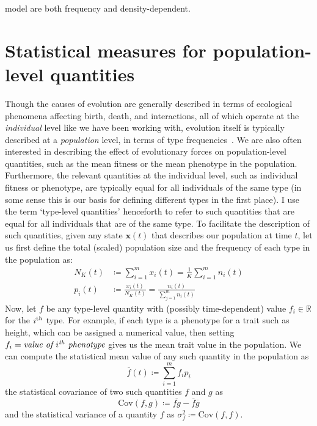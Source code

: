 model are both frequency and density-dependent.

\section{Statistical measures for population-level quantities}\label{sec_stat_measures}

Though the causes of evolution are generally described in terms of ecological phenomena affecting birth, death, and interactions, all of which operate at the \emph{individual} level like we have been working with, evolution itself is typically described at a \emph{population} level, in terms of type frequencies~\citep{bourrat_evolution_2019}. We are also often interested in describing the effect of evolutionary forces on population-level quantities, such as the mean fitness or the mean phenotype in the population. Furthermore, the relevant quantities at the individual level, such as individual fitness or phenotype, are typically equal for all individuals of the same type (in some sense this is our basis for defining different types in the first place). I use the term `type-level quantities' henceforth to refer to such quantities that are equal for all individuals that are of the same type. To facilitate the description of such quantities, given any state $\mathbf{x}(t)$ that describes our population at time $t$, let us first define the total (scaled) population size and the frequency of each type in the population as:
\begin{equation}
	\label{nD_tot_pop_and_prop_inds_defn}
	\begin{aligned}
		N_{K}(t) &\coloneqq \sum\limits_{i=1}^{m}x_i(t) = \frac{1}{K}\sum\limits_{i=1}^{m}n_i(t)\\
		p_i(t) &\coloneqq \frac{x_i(t)}{N_{K}(t)} = \frac{n_i(t)}{\sum\limits_{j=1}^{m}n_i(t)}
	\end{aligned}
\end{equation}
Now, let $f$ be any type-level quantity with (possibly time-dependent) value $f_i \in \mathbb{R}$ for the $i\textsuperscript{th}$ type. For example, if each type is a phenotype for a trait such as height, which can be assigned a numerical value, then setting $f_i = \textit{value of $i\textsuperscript{th}$ phenotype}$ gives us the mean trait value in the population. We can compute the statistical mean value of any such quantity in the population as
\begin{equation}
\label{nD_mean}
\overline{f}(t) \coloneqq \sum\limits_{i=1}^{m}f_ip_{i}
\end{equation}
the statistical covariance of two such quantities $f$ and $g$ as
\begin{equation}
\label{nD_cov}
\textrm{Cov}(f,g) \coloneqq \overline{fg} - \overline{f}\overline{g}
\end{equation}
and the statistical variance of a quantity $f$ as $\sigma^2_f \coloneqq \textrm{Cov}(f,f)$.


